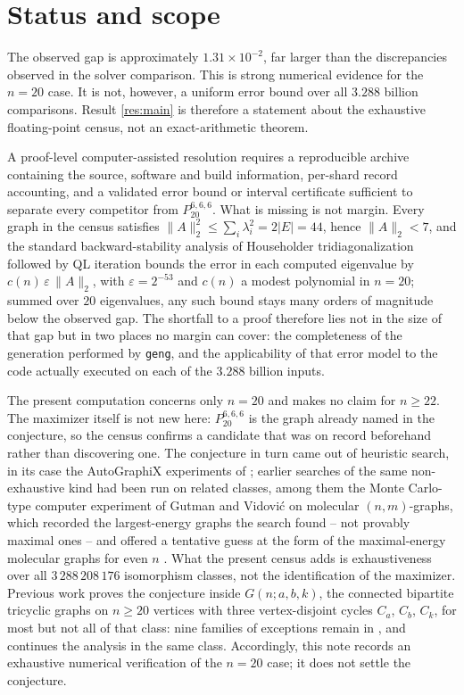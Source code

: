\documentclass[11pt]{amsart}
\newcommand{\target}{P_{20}^{6,6,6}}
\begin{document}
\section{Status and scope}

The observed gap is approximately $1.31\times10^{-2}$, far larger
than the discrepancies observed in the solver comparison. This is
strong numerical evidence for the $n=20$ case. It is not, however, a
uniform error bound over all $3.288$ billion comparisons. Result
\ref{res:main} is therefore a statement about the exhaustive
floating-point census, not an exact-arithmetic theorem.

A proof-level computer-assisted resolution requires a reproducible
archive containing the source, software and build information,
per-shard record accounting, and a validated error bound or interval
certificate sufficient to separate every competitor from $\target$.
What is missing is not margin. Every graph in the census satisfies
$\|A\|_2^2\le\sum_i\lambda_i^2=2|E|=44$, hence $\|A\|_2<7$, and the
standard backward-stability analysis of Householder tridiagonalization
followed by QL iteration bounds the error in each computed eigenvalue
by $c(n)\,\varepsilon\,\|A\|_2$, with $\varepsilon=2^{-53}$ and $c(n)$
a modest polynomial in $n=20$; summed over $20$ eigenvalues, any such
bound stays many orders of magnitude below the observed gap. The
shortfall to a proof therefore lies not in the size of that gap but in
two places no margin can cover: the completeness of the generation
performed by \texttt{geng}, and the applicability of that error model
to the code actually executed on each of the $3.288$ billion inputs.

The present computation concerns only $n=20$ and makes no claim for
$n\ge22$. The maximizer itself is not new here: $\target$ is the graph
already named in the conjecture, so the census confirms a candidate
that was on record beforehand rather than discovering one. The
conjecture in turn came out of heuristic search, in its case the
AutoGraphiX experiments of \cite{ACH}; earlier searches of the same
non-exhaustive kind had been run on related classes, among them the
Monte Carlo-type computer experiment of Gutman and Vidovi\'c on
molecular $(n,m)$-graphs, which recorded the largest-energy graphs the
search found -- not provably maximal ones -- and offered a tentative
guess at the form of the maximal-energy molecular graphs for even $n$
\cite{GV}. What the present census adds is exhaustiveness over all
$3\,288\,208\,176$ isomorphism classes, not the identification of the
maximizer. Previous work proves
the conjecture inside $G(n;a,b,k)$, the connected bipartite tricyclic
graphs on $n\ge20$ vertices with three vertex-disjoint cycles $C_a$,
$C_b$, $C_k$, for most but not all of that class: nine families of
exceptions remain in \cite{LSWL}, and \cite{LMW} continues the analysis
in the same class. Accordingly, this note records an exhaustive
numerical verification of the $n=20$ case; it does not settle the
conjecture.
\end{document}
